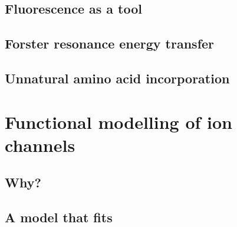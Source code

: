 \subsection{Fluorescence as a tool}

\subsection{Forster resonance energy transfer}

\subsection{Unnatural amino acid incorporation}

\section{Functional modelling of ion channels}

\subsection{Why?}

\subsection{A model that fits}
